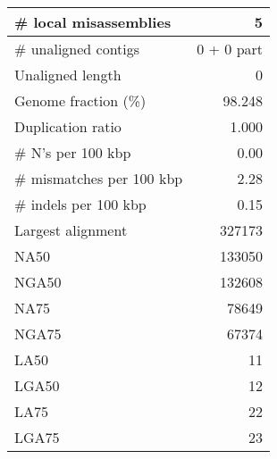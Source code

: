 \documentclass[12pt,a4paper]{article}
\begin{document}
\begin{table}[ht]
\begin{center}
\begin{tabular}{|l*{1}{|r}|}
\# local misassemblies & 5 \\ \hline
\# unaligned contigs & 0 + 0 part \\ \hline
Unaligned length & 0 \\ \hline
Genome fraction (\%) & 98.248 \\ \hline
Duplication ratio & 1.000 \\ \hline
\# N's per 100 kbp & 0.00 \\ \hline
\# mismatches per 100 kbp & 2.28 \\ \hline
\# indels per 100 kbp & 0.15 \\ \hline
Largest alignment & 327173 \\ \hline
NA50 & 133050 \\ \hline
NGA50 & 132608 \\ \hline
NA75 & 78649 \\ \hline
NGA75 & 67374 \\ \hline
LA50 & 11 \\ \hline
LGA50 & 12 \\ \hline
LA75 & 22 \\ \hline
LGA75 & 23 \\ \hline
\end{tabular}
\end{center}
\end{table}
\end{document}
